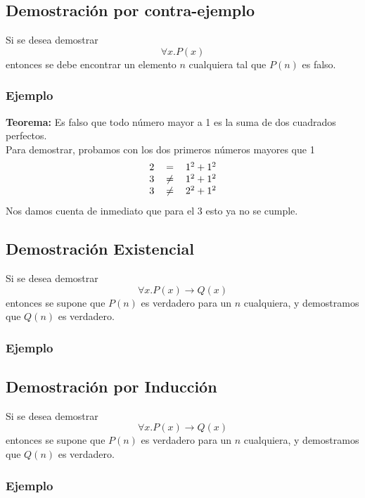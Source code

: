\documentclass[../main.tex]{subfiles}
\begin{document}
\subsection{Demostración por contra-ejemplo}
Si se desea demostrar
\[ \forall x . P(x) \]
entonces se debe encontrar un elemento $n$ cualquiera tal que $P(n)$ es falso.
\subsubsection*{Ejemplo}
\textbf{Teorema:} Es falso que todo número mayor a 1 es la suma de dos cuadrados perfectos.\\
Para demostrar, probamos con los dos primeros números mayores que 1
\[
    \begin{tabular}{rcl}
        $2$ & $=$ & $1^2 + 1^2$\\
        $3$ & $\not=$ & $1^2 + 1^2$\\
        $3$ & $\not=$ & $2^2 + 1^2$\\
    \end{tabular}
\]
Nos damos cuenta de inmediato que para el 3 esto ya no se cumple.

\subsection{Demostración Existencial}
Si se desea demostrar
\[ \forall x . P(x) \rightarrow Q(x) \]
entonces se supone que $P(n)$ es verdadero para un $n$ cualquiera, y demostramos que $Q(n)$ es verdadero.
\subsubsection*{Ejemplo}

\subsection{Demostración por Inducción}
Si se desea demostrar
\[ \forall x . P(x) \rightarrow Q(x) \]
entonces se supone que $P(n)$ es verdadero para un $n$ cualquiera, y demostramos que $Q(n)$ es verdadero.
\subsubsection*{Ejemplo}
\end{document}

